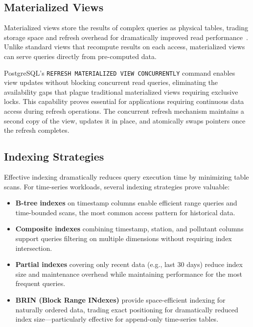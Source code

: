 \subsection{Materialized Views}
\label{subsec:lit_matviews}

Materialized views store the results of complex queries as physical tables, trading storage space and refresh overhead for dramatically improved read performance~\citep{postgsmv}. Unlike standard views that recompute results on each access, materialized views can serve queries directly from pre-computed data.

PostgreSQL's \texttt{REFRESH MATERIALIZED VIEW CONCURRENTLY} command enables view updates without blocking concurrent read queries, eliminating the availability gaps that plague traditional materialized views requiring exclusive locks. This capability proves essential for applications requiring continuous data access during refresh operations. The concurrent refresh mechanism maintains a second copy of the view, updates it in place, and atomically swaps pointers once the refresh completes.

\subsection{Indexing Strategies}
\label{subsec:lit_indexing}

Effective indexing dramatically reduces query execution time by minimizing table scans. For time-series workloads, several indexing strategies prove valuable:

\begin{itemize}
    \item \textbf{B-tree indexes} on timestamp columns enable efficient range queries and time-bounded scans, the most common access pattern for historical data.
    \item \textbf{Composite indexes} combining timestamp, station, and pollutant columns support queries filtering on multiple dimensions without requiring index intersection.
    \item \textbf{Partial indexes} covering only recent data (e.g., last 30 days) reduce index size and maintenance overhead while maintaining performance for the most frequent queries.
    \item \textbf{BRIN (Block Range INdexes)} provide space-efficient indexing for naturally ordered data, trading exact positioning for dramatically reduced index size—particularly effective for append-only time-series tables.
\end{itemize}

